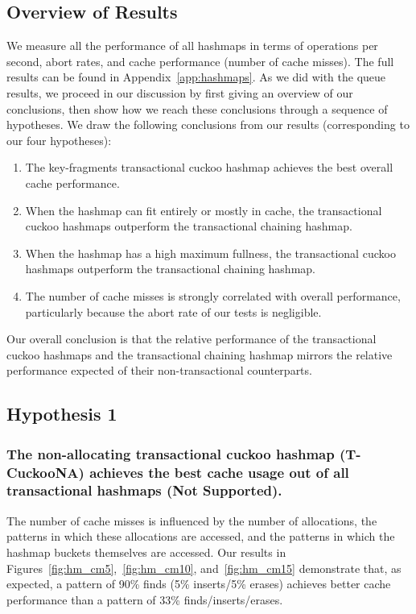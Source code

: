 \subsection{Overview of Results}

We measure all the performance of all hashmaps in terms of operations per second, abort rates, and cache performance (number of cache misses). 
The full results can be found in Appendix~\ref{app:hashmaps}. As we did with the queue results, we proceed in our discussion by first giving an overview of our conclusions, then show how we reach these conclusions through a sequence of hypotheses. We draw the following conclusions from our results (corresponding to our four hypotheses):
\begin{enumerate}
    \item The key-fragments transactional cuckoo hashmap achieves the best overall cache performance. 
    \item When the hashmap can fit entirely or mostly in cache, the transactional cuckoo hashmaps outperform the transactional chaining hashmap.
    \item When the hashmap has a high maximum fullness, the transactional cuckoo hashmaps outperform the transactional chaining hashmap.
    \item The number of cache misses is strongly correlated with overall performance, particularly because the abort rate of our tests is negligible.
\end{enumerate}
Our overall conclusion is that the relative performance of the transactional cuckoo hashmaps and the transactional chaining hashmap mirrors the relative performance expected of their non-transactional counterparts.

\subsection{Hypothesis 1}
\subsubsection{The non-allocating transactional cuckoo hashmap (T-CuckooNA) achieves the best cache usage out of all transactional hashmaps (Not Supported).}
\label{section:hmcm}

The number of cache misses is influenced by the number of allocations, the patterns in which these allocations are accessed, and the patterns in which the hashmap buckets themselves are accessed. Our results in Figures~\ref{fig:hm_cm5},~\ref{fig:hm_cm10}, and~\ref{fig:hm_cm15} demonstrate that, as expected, a pattern of 90\% finds (5\% inserts/5\% erases) achieves better cache performance than a pattern of 33\% finds/inserts/erases.

